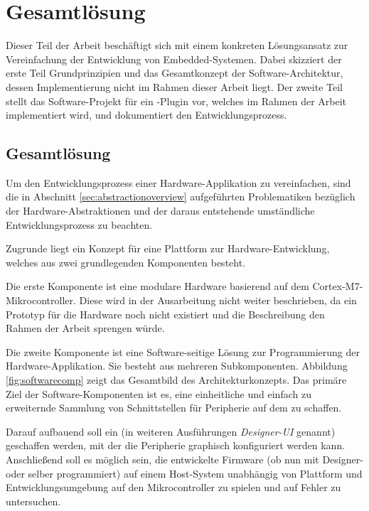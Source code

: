 \section{Gesamtlösung}
\label{sec:overallsolution}
    Dieser Teil der Arbeit beschäftigt sich mit einem konkreten Lösungsansatz zur Vereinfachung der Entwicklung von
    Embedded-Systemen. Dabei skizziert der erste Teil Grundprinzipien und das Gesamtkonzept der Software-Architektur,
    dessen Implementierung nicht im Rahmen dieser Arbeit liegt. Der zweite Teil stellt das Software-Projekt für ein
    -Plugin vor, welches im Rahmen der Arbeit implementiert wird, und dokumentiert den Entwicklungsprozess.
    \subsection{Gesamtlösung}

    Um den Entwicklungsprozess einer Hardware-Applikation zu vereinfachen, sind die in Abschnitt
    \ref{sec:abstractionoverview} aufgeführten Problematiken bezüglich der Hardware-Abstraktionen und der daraus
    entstehende umständliche Entwicklungsprozess zu beachten.

    Zugrunde liegt ein Konzept für eine Plattform zur Hardware-Entwicklung, welches aus zwei grundlegenden
    Komponenten besteht.

    Die erste Komponente ist eine modulare Hardware basierend auf dem Cortex-M7-Mikrocontroller. Diese wird in der
    Ausarbeitung nicht weiter beschrieben, da ein Prototyp für die Hardware noch nicht existiert und die Beschreibung den
    Rahmen der Arbeit sprengen würde.

    Die zweite Komponente ist eine Software-seitige Lösung zur Programmierung der Hardware-Applikation. Sie besteht aus
    mehreren Subkomponenten. Abbildung \ref{fig:softwarecomp} zeigt das Gesamtbild des Architekturkonzepts.
    Das primäre Ziel der Software-Komponenten ist es, eine einheitliche und einfach zu erweiternde Sammlung von
    Schnittstellen für Peripherie auf dem  zu schaffen.

    Darauf aufbauend soll ein  (in weiteren Ausführungen \textit{Designer\hyp{}UI} genannt) geschaffen werden,
    mit der die Peripherie graphisch konfiguriert werden kann.
    Anschließend soll es möglich sein, die entwickelte Firmware (ob nun mit Designer- oder selber
    programmiert) auf einem Host-System unabhängig von Plattform und Entwicklungsumgebung auf den Mikrocontroller zu
    spielen und auf Fehler zu untersuchen.

